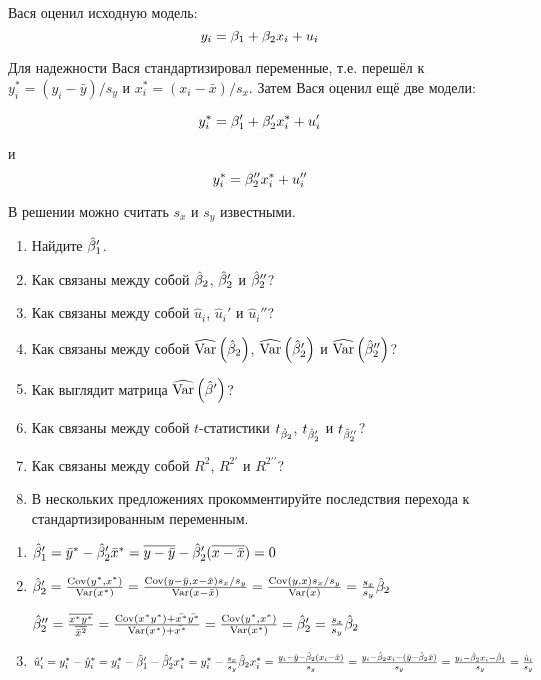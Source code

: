 \begin{problem}
Вася оценил исходную модель:
\[
y_i=\beta_1+\beta_2 x_i + u_i
\]

Для надежности Вася стандартизировал переменные, т.е. перешёл к $y_i^*=(y_i-\bar{y})/s_y$ и $x_i^*=(x_i-\bar{x})/s_x$. Затем Вася оценил ещё две модели:

\[
y_i^*=\beta_1'+\beta_2' x^*_i + u_i'
\]

и
\[
y_i^*=\beta_2'' x^*_i + u_i''
\]

В решении можно считать $s_x$ и $s_y$ известными.

\begin{enumerate}
\item Найдите $\hat{\beta}_1'$.
\item Как связаны между собой $\hat{\beta}_2$, $\hat{\beta}_2'$ и $\hat{\beta}_2''$?
\item Как связаны между собой $\hat{u}_i$, $\hat{u}_i'$ и $\hat{u}_i''$?
\item Как связаны между собой $\widehat{\operatorname{Var}}\left(\hat{\beta}_2\right)$, $\widehat{\operatorname{Var}}\left(\hat{\beta}_2'\right)$ и $\widehat{\operatorname{Var}}\left(\hat{\beta}_2''\right)$?
\item Как выглядит матрица $\widehat{\operatorname{Var}}\left(\hat{\beta}'\right)$?
\item Как связаны между собой $t$-статистики $t_{\hat{\beta}_2}$, $t_{\hat{\beta}_2'}$ и $t_{\hat{\beta}_2''}$?
\item Как связаны между собой $R^2$, $R^{2\prime}$ и $R^{2\prime\prime}$?
\item В нескольких предложениях прокомментируйте последствия перехода к стандартизированным переменным.
\end{enumerate}

\begin{sol}


\begin{enumerate}
\item $\hat\beta_1'=\bar y^* -\hat{\beta}_2'\bar x^*=\overline{y-\bar y}-\hat{\beta}_2'(\overline{x-\bar x})=0$

\item $\hat{\beta}_2'=\frac{\operatorname{Cov}(y^*,x^*)}{\operatorname{Var}(x^*)}=\frac{\operatorname{Cov}(y-\bar y,x-\bar x)s_x/s_y}{\operatorname{Var}(x-\bar x)}=\frac{\operatorname{Cov}(y,x)s_x/s_y}{\operatorname{Var}(x)}=\frac{s_x}{s_y}\hat{\beta}_2$

$\hat{\beta}_2''=\frac{\overline{x^*y^*}}{\overline{\bar x^2}}=\frac{\operatorname{Cov}(x^*y^*)+\bar{x^*}\bar{y^*}}{\operatorname{Var}(x^*)+\bar{x^*}}=\frac{\operatorname{Cov}(y^*,x^*)}{\operatorname{Var}(x^*)}=\hat{\beta}_2'=\frac{s_x}{s_y}\hat{\beta}_2$

\item $\hat u_i'=y_i^*-\hat{y}_i^*=y_i^*-\hat{\beta}_1'-\hat{\beta}_2'x_i^*=y_i^*-\frac{s_x}{s_y}\hat{\beta}_2x_i^*=\frac{y_i-\bar y-\hat{\beta}_2(x_i-\bar x)}{s_y}=\frac{y_i-\hat{\beta}_2x_i-(\bar y-\hat{\beta}_2\bar x)}{s_y}=\frac{y_i-\hat{\beta}_2x_i-\hat{\beta}_1}{s_y}=\frac{\hat u_i}{s_y}$


\end{enumerate}
\end{sol}
\end{problem}
